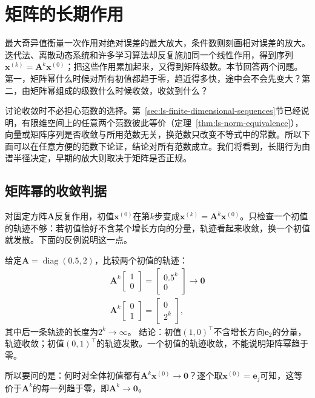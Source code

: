 
\section{矩阵的长期作用}
\label{sec:ls-convergence}
\label{sec:linear-algebra-convergence-approximation}
\label{sec:ls-matrix-power-behavior}
\label{sec:linear-algebra-power-convergence}

最大奇异值衡量一次作用对绝对误差的最大放大，条件数则刻画相对误差的放大。迭代法、离散动态系统和许多学习算法却反复施加同一个线性作用，得到序列$\bm x^{(k)}=\bm A^k\bm x^{(0)}$；把这些作用累加起来，又得到矩阵级数。本节回答两个问题。第一，矩阵幂什么时候对所有初值都趋于零，趋近得多快，途中会不会先变大？第二，由矩阵幂组成的级数什么时候收敛，收敛到什么？

讨论收敛时不必担心范数的选择。第~\ref{sec:ls-finite-dimensional-sequences}节已经说明，有限维空间上的任意两个范数彼此等价（定理~\ref{thm:ls-norm-equivalence}），向量或矩阵序列是否收敛与所用范数无关，换范数只改变不等式中的常数。所以下面可以在任意方便的范数下论证，结论对所有范数成立。我们将看到，长期行为由谱半径决定，早期的放大则取决于矩阵是否正规。

\subsection{矩阵幂的收敛判据}

对固定方阵$\bm A$反复作用，初值$\bm x^{(0)}$在第$k$步变成$\bm x^{(k)}=\bm A^k\bm x^{(0)}$。只检查一个初值的轨迹不够：若初值恰好不含某个增长方向的分量，轨迹看起来收敛，换一个初值就发散。下面的反例说明这一点。
\begin{example}[反例：收敛与发散的轨迹]
\label{ex:ls-partial-convergence}
给定$\bm A=\operatorname{diag}(0.5,2)$，比较两个初值的轨迹：
\[
\begin{gathered}
\bm A^k\begin{bmatrix}1\\0\end{bmatrix}=\begin{bmatrix}0.5^k\\0\end{bmatrix}\to\bm0\\
\bm A^k\begin{bmatrix}0\\1\end{bmatrix}=\begin{bmatrix}0\\2^k\end{bmatrix},
\end{gathered}
\]
其中后一条轨迹的长度为$2^k\to\infty$。
结论：初值$(1,0)^\top$不含增长方向$\bm e_2$的分量，轨迹收敛；初值$(0,1)^\top$的轨迹发散。一个初值的轨迹收敛，不能说明矩阵幂趋于零。
\end{example}
所以要问的是：何时对全体初值都有$\bm A^k\bm x^{(0)}\to\bm0$？逐个取$\bm x^{(0)}=\bm e_j$可知，这等价于$\bm A^k$的每一列趋于零，即$\bm A^k\to\bm0$。

